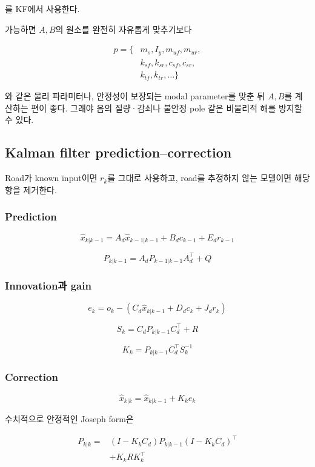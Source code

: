 \documentclass[letterpaper,10pt,journal,twocolumn]{ieeeconf}
\begin{document}
를 KF에서 사용한다.

가능하면 \(A,B\)의 원소를 완전히 자유롭게 맞추기보다

\[
\begin{aligned}
p=\{&
m_s,I_y,m_{uf},m_{ur},\\
&k_{sf},k_{sr},c_{sf},c_{sr},\\
&k_{tf},k_{tr},\ldots\}
\end{aligned}
\]

와 같은 물리 파라미터나, 안정성이 보장되는 modal parameter를 맞춘 뒤 \(A,B\)를 계산하는 편이 좋다. 그래야 음의 질량·감쇠나 불안정 pole 같은 비물리적 해를 방지할 수 있다.

\subsection{Kalman filter prediction--correction}

Road가 known input이면 \(r_k\)를 그대로 사용하고, road를 추정하지 않는 모델이면 해당 항을 제거한다.

\subsubsection{Prediction}

\[
\hat x_{k|k-1}
=
A_d\hat x_{k-1|k-1}
+B_dc_{k-1}
+E_d r_{k-1}
\]

\[
P_{k|k-1}
=
A_dP_{k-1|k-1}A_d^\top+Q
\]

\subsubsection{Innovation과 gain}

\[
e_k
=
o_k-
\left(
C_d\hat x_{k|k-1}
+D_dc_k
+J_dr_k
\right)
\]

\[
S_k
=
C_dP_{k|k-1}C_d^\top+R
\]

\[
K_k
=
P_{k|k-1}C_d^\top S_k^{-1}
\]

\subsubsection{Correction}

\[
\hat x_{k|k}
=
\hat x_{k|k-1}+K_ke_k
\]

수치적으로 안정적인 Joseph form은

\[
\begin{aligned}
P_{k|k}
={}&(I-K_kC_d)P_{k|k-1}(I-K_kC_d)^\top\\
&+K_kRK_k^\top
\end{aligned}
\]
\end{document}
